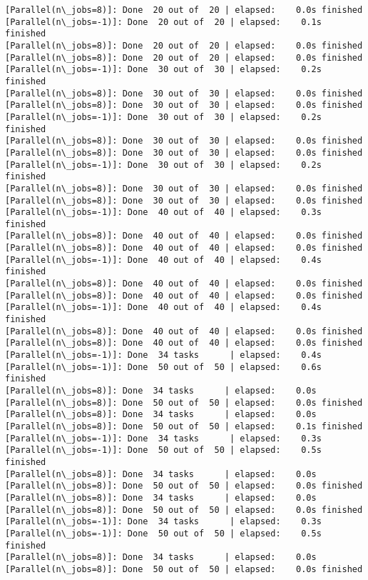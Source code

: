 \documentclass[11pt]{article}
\begin{document}
\begin{Verbatim}[commandchars=\\\{\}]
[Parallel(n\_jobs=8)]: Done  20 out of  20 | elapsed:    0.0s finished
[Parallel(n\_jobs=-1)]: Done  20 out of  20 | elapsed:    0.1s finished
[Parallel(n\_jobs=8)]: Done  20 out of  20 | elapsed:    0.0s finished
[Parallel(n\_jobs=8)]: Done  20 out of  20 | elapsed:    0.0s finished
[Parallel(n\_jobs=-1)]: Done  30 out of  30 | elapsed:    0.2s finished
[Parallel(n\_jobs=8)]: Done  30 out of  30 | elapsed:    0.0s finished
[Parallel(n\_jobs=8)]: Done  30 out of  30 | elapsed:    0.0s finished
[Parallel(n\_jobs=-1)]: Done  30 out of  30 | elapsed:    0.2s finished
[Parallel(n\_jobs=8)]: Done  30 out of  30 | elapsed:    0.0s finished
[Parallel(n\_jobs=8)]: Done  30 out of  30 | elapsed:    0.0s finished
[Parallel(n\_jobs=-1)]: Done  30 out of  30 | elapsed:    0.2s finished
[Parallel(n\_jobs=8)]: Done  30 out of  30 | elapsed:    0.0s finished
[Parallel(n\_jobs=8)]: Done  30 out of  30 | elapsed:    0.0s finished
[Parallel(n\_jobs=-1)]: Done  40 out of  40 | elapsed:    0.3s finished
[Parallel(n\_jobs=8)]: Done  40 out of  40 | elapsed:    0.0s finished
[Parallel(n\_jobs=8)]: Done  40 out of  40 | elapsed:    0.0s finished
[Parallel(n\_jobs=-1)]: Done  40 out of  40 | elapsed:    0.4s finished
[Parallel(n\_jobs=8)]: Done  40 out of  40 | elapsed:    0.0s finished
[Parallel(n\_jobs=8)]: Done  40 out of  40 | elapsed:    0.0s finished
[Parallel(n\_jobs=-1)]: Done  40 out of  40 | elapsed:    0.4s finished
[Parallel(n\_jobs=8)]: Done  40 out of  40 | elapsed:    0.0s finished
[Parallel(n\_jobs=8)]: Done  40 out of  40 | elapsed:    0.0s finished
[Parallel(n\_jobs=-1)]: Done  34 tasks      | elapsed:    0.4s
[Parallel(n\_jobs=-1)]: Done  50 out of  50 | elapsed:    0.6s finished
[Parallel(n\_jobs=8)]: Done  34 tasks      | elapsed:    0.0s
[Parallel(n\_jobs=8)]: Done  50 out of  50 | elapsed:    0.0s finished
[Parallel(n\_jobs=8)]: Done  34 tasks      | elapsed:    0.0s
[Parallel(n\_jobs=8)]: Done  50 out of  50 | elapsed:    0.1s finished
[Parallel(n\_jobs=-1)]: Done  34 tasks      | elapsed:    0.3s
[Parallel(n\_jobs=-1)]: Done  50 out of  50 | elapsed:    0.5s finished
[Parallel(n\_jobs=8)]: Done  34 tasks      | elapsed:    0.0s
[Parallel(n\_jobs=8)]: Done  50 out of  50 | elapsed:    0.0s finished
[Parallel(n\_jobs=8)]: Done  34 tasks      | elapsed:    0.0s
[Parallel(n\_jobs=8)]: Done  50 out of  50 | elapsed:    0.0s finished
[Parallel(n\_jobs=-1)]: Done  34 tasks      | elapsed:    0.3s
[Parallel(n\_jobs=-1)]: Done  50 out of  50 | elapsed:    0.5s finished
[Parallel(n\_jobs=8)]: Done  34 tasks      | elapsed:    0.0s
[Parallel(n\_jobs=8)]: Done  50 out of  50 | elapsed:    0.0s finished

\end{Verbatim}
\end{document}
